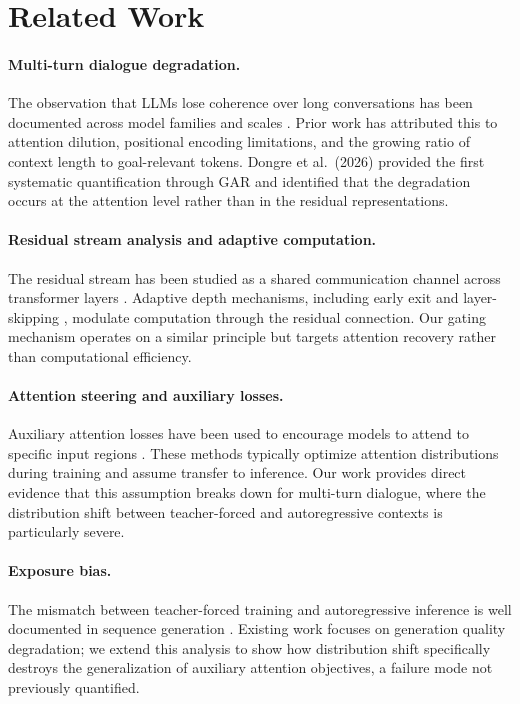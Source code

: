 \documentclass[11pt,a4paper]{article}
\begin{document}
\section{Related Work}

\paragraph{Multi-turn dialogue degradation.}
The observation that LLMs lose coherence over long conversations has been documented across model families and scales \citep{dongre2026}.
Prior work has attributed this to attention dilution, positional encoding limitations, and the growing ratio of context length to goal-relevant tokens.
Dongre et al.\ (2026) provided the first systematic quantification through GAR and identified that the degradation occurs at the attention level rather than in the residual representations.

\paragraph{Residual stream analysis and adaptive computation.}
The residual stream has been studied as a shared communication channel across transformer layers \citep{elhage2021}.
Adaptive depth mechanisms, including early exit \citep{schuster2022} and layer-skipping \citep{raposo2024}, modulate computation through the residual connection.
Our gating mechanism operates on a similar principle but targets attention recovery rather than computational efficiency.

\paragraph{Attention steering and auxiliary losses.}
Auxiliary attention losses have been used to encourage models to attend to specific input regions \citep{strubell2018,baan2019}.
These methods typically optimize attention distributions during training and assume transfer to inference.
Our work provides direct evidence that this assumption breaks down for multi-turn dialogue, where the distribution shift between teacher-forced and autoregressive contexts is particularly severe.

\paragraph{Exposure bias.}
The mismatch between teacher-forced training and autoregressive inference is well documented in sequence generation \citep{ranzato2016,bengio2015}.
Existing work focuses on generation quality degradation; we extend this analysis to show how distribution shift specifically destroys the generalization of auxiliary attention objectives, a failure mode not previously quantified.
\end{document}
